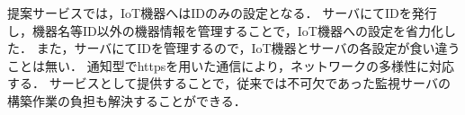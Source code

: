 提案サービスでは，IoT機器へはIDのみの設定となる．
サーバにてIDを発行し，機器名等ID以外の機器情報を管理することで，IoT機器への設定を省力化した．
また，サーバにてIDを管理するので，IoT機器とサーバの各設定が食い違うことは無い．
通知型でhttpsを用いた通信により，ネットワークの多様性に対応する．
サービスとして提供することで，従来では不可欠であった監視サーバの構築作業の負担も解決することができる．

